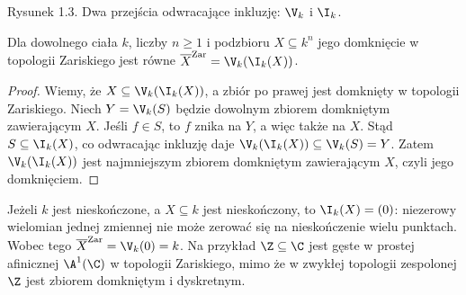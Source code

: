 \begin{center}
\end{center}
\begin{center}\small Rysunek 1.3. Dwa przejścia odwracające inkluzję: $\V_k$ i $\I_k$.\end{center}

\begin{stwierdzenie}
\label{st:closure}
Dla dowolnego ciała $k$, liczby $n\ge1$ i podzbioru
$X\subseteq k^n$ jego domknięcie w topologii Zariskiego jest równe
$\overline X^{\mathrm{Zar}}=\V_k(\I_k(X))$.
\end{stwierdzenie}
\begin{proof}
Wiemy, że $X\subseteq\V_k(\I_k(X))$, a zbiór po prawej
jest domknięty w topologii Zariskiego.
Niech $Y=\V_k(S)$ będzie dowolnym zbiorem domkniętym zawierającym $X$.
Jeśli $f\in S$, to $f$ znika na $Y$, a więc także na $X$.
Stąd $S\subseteq\I_k(X)$, co odwracając inkluzję daje
$\V_k(\I_k(X))\subseteq\V_k(S)=Y$.
Zatem $\V_k(\I_k(X))$ jest najmniejszym zbiorem domkniętym
zawierającym $X$, czyli jego domknięciem.
\end{proof}

\begin{przyklad}
Jeżeli $k$ jest nieskończone, a $X\subseteq k$ jest nieskończony,
to $\I_k(X)=(0)$: niezerowy wielomian jednej zmiennej nie może
zerować się na nieskończenie wielu punktach.
Wobec tego $\overline X^{\mathrm{Zar}}=\V_k(0)=k$.
Na przykład $\Z\subseteq\C$ jest gęste w prostej afinicznej
$\A^1(\C)$ w topologii Zariskiego, mimo że w zwykłej topologii
zespolonej $\Z$ jest zbiorem domkniętym i dyskretnym.
\end{przyklad}

